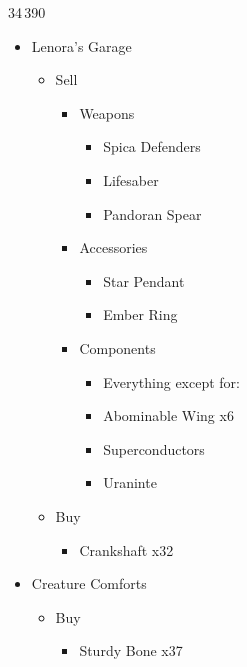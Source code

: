 \begin{multicols}{2}
	\begin{shop}{34\,390}
		\begin{itemize}
			\item Lenora's Garage
			      \begin{itemize}
				      \item Sell
				            \begin{itemize}
					            \item Weapons
					                  \begin{itemize}
						                  \item Spica Defenders
						                  \item Lifesaber
						                  \item Pandoran Spear
					                  \end{itemize}
					            \item Accessories
					                  \begin{itemize}
						                  \item Star Pendant
						                  \item Ember Ring
					                  \end{itemize}
					            \item Components
					                  \begin{itemize}
						                  \item Everything except for:
						                  \item Abominable Wing x6
						                  \item Superconductors
						                  \item Uraninte
					                  \end{itemize}
				            \end{itemize}
				      \item Buy
				            \begin{itemize}
					            \item Crankshaft x32
				            \end{itemize}
			      \end{itemize}
			\item Creature Comforts
			      \begin{itemize}
				      \item Buy
				            \begin{itemize}
					            \item Sturdy Bone x37
				            \end{itemize}

\end{itemize}
\end{itemize}
\end{shop}
\end{multicols}
